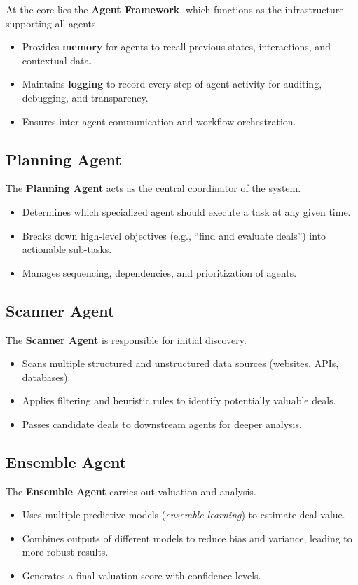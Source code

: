 At the core lies the \textbf{Agent Framework}, which functions as the infrastructure supporting all agents.
\begin{itemize}
    \item Provides \textbf{memory} for agents to recall previous states, interactions, and contextual data.  
    \item Maintains \textbf{logging} to record every step of agent activity for auditing, debugging, and transparency.  
    \item Ensures inter-agent communication and workflow orchestration.  
\end{itemize}

\subsection{Planning Agent}

The \textbf{Planning Agent} acts as the central coordinator of the system.
\begin{itemize}
    \item Determines which specialized agent should execute a task at any given time.  
    \item Breaks down high-level objectives (e.g., ``find and evaluate deals'') into actionable sub-tasks.  
    \item Manages sequencing, dependencies, and prioritization of agents.  
\end{itemize}

\subsection{Scanner Agent}

The \textbf{Scanner Agent} is responsible for initial discovery.
\begin{itemize}
    \item Scans multiple structured and unstructured data sources (websites, APIs, databases).  
    \item Applies filtering and heuristic rules to identify potentially valuable deals.  
    \item Passes candidate deals to downstream agents for deeper analysis.  
\end{itemize}

\subsection{Ensemble Agent}

The \textbf{Ensemble Agent} carries out valuation and analysis.
\begin{itemize}
    \item Uses multiple predictive models (\emph{ensemble learning}) to estimate deal value.  
    \item Combines outputs of different models to reduce bias and variance, leading to more robust results.  
    \item Generates a final valuation score with confidence levels.  
\end{itemize}

